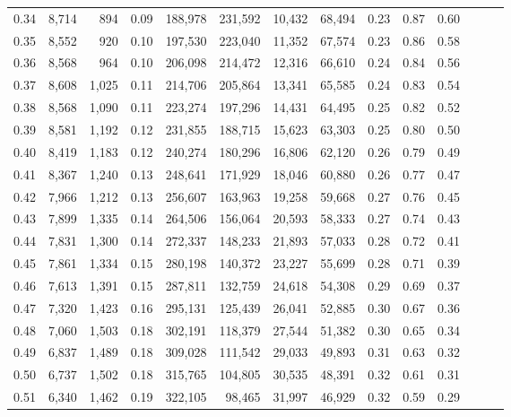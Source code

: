 \begin{tabular}{rrrrrrrrrrrrrr}
0.34 &   8,714 &    894 &  0.09 &  188,978 &  231,592 &  10,432 &  68,494 &  0.23 &  0.87 &      0.60 \\
0.35 &   8,552 &    920 &  0.10 &  197,530 &  223,040 &  11,352 &  67,574 &  0.23 &  0.86 &      0.58 \\
0.36 &   8,568 &    964 &  0.10 &  206,098 &  214,472 &  12,316 &  66,610 &  0.24 &  0.84 &      0.56 \\
0.37 &   8,608 &  1,025 &  0.11 &  214,706 &  205,864 &  13,341 &  65,585 &  0.24 &  0.83 &      0.54 \\
0.38 &   8,568 &  1,090 &  0.11 &  223,274 &  197,296 &  14,431 &  64,495 &  0.25 &  0.82 &      0.52 \\
0.39 &   8,581 &  1,192 &  0.12 &  231,855 &  188,715 &  15,623 &  63,303 &  0.25 &  0.80 &      0.50 \\
0.40 &   8,419 &  1,183 &  0.12 &  240,274 &  180,296 &  16,806 &  62,120 &  0.26 &  0.79 &      0.49 \\
0.41 &   8,367 &  1,240 &  0.13 &  248,641 &  171,929 &  18,046 &  60,880 &  0.26 &  0.77 &      0.47 \\
0.42 &   7,966 &  1,212 &  0.13 &  256,607 &  163,963 &  19,258 &  59,668 &  0.27 &  0.76 &      0.45 \\
0.43 &   7,899 &  1,335 &  0.14 &  264,506 &  156,064 &  20,593 &  58,333 &  0.27 &  0.74 &      0.43 \\
0.44 &   7,831 &  1,300 &  0.14 &  272,337 &  148,233 &  21,893 &  57,033 &  0.28 &  0.72 &      0.41 \\
0.45 &   7,861 &  1,334 &  0.15 &  280,198 &  140,372 &  23,227 &  55,699 &  0.28 &  0.71 &      0.39 \\
0.46 &   7,613 &  1,391 &  0.15 &  287,811 &  132,759 &  24,618 &  54,308 &  0.29 &  0.69 &      0.37 \\
0.47 &   7,320 &  1,423 &  0.16 &  295,131 &  125,439 &  26,041 &  52,885 &  0.30 &  0.67 &      0.36 \\
0.48 &   7,060 &  1,503 &  0.18 &  302,191 &  118,379 &  27,544 &  51,382 &  0.30 &  0.65 &      0.34 \\
0.49 &   6,837 &  1,489 &  0.18 &  309,028 &  111,542 &  29,033 &  49,893 &  0.31 &  0.63 &      0.32 \\
0.50 &   6,737 &  1,502 &  0.18 &  315,765 &  104,805 &  30,535 &  48,391 &  0.32 &  0.61 &      0.31 \\
0.51 &   6,340 &  1,462 &  0.19 &  322,105 &   98,465 &  31,997 &  46,929 &  0.32 &  0.59 &      0.29 \\

\end{tabular}
